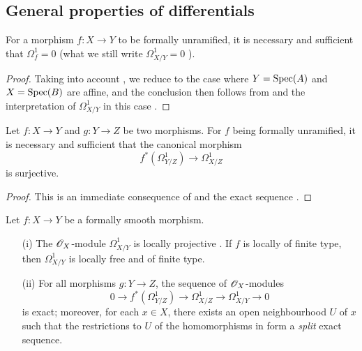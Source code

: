 \subsection{General properties of differentials}
\label{subsection:IV.17.2}

\begin{proposition}[17.2.1]
\label{IV.17.2.1}
For a morphism $f:X\to Y$ to be formally unramified, it is necessary and sufficient that $\Omega_f^1=0$ (what we still write $\Omega_{X/Y}^1=0$ ).  
\end{proposition}

\begin{proof}
Taking into account , we reduce to the case where $Y=\operatorname{Spec}(A)$ and $X=\operatorname{Spec}(B)$ are affine, and the conclusion then follows from  and the interpretation of $\Omega_{X/Y}^1$ in this case .
\end{proof}

\begin{corollary}[17.2.2]
\label{IV.17.2.2}
Let $f:X\to Y$ and $g:Y\to Z$ be two morphisms. 
For $f$ being formally unramified, it is necessary and sufficient that the canonical morphism 
\[
  f^*(\Omega^1_{Y/Z})\to \Omega^1_{X/Z}
\] is surjective.
\end{corollary}

\begin{proof}
This is an immediate consequence of  and the exact sequence .
\end{proof}

\begin{proposition}[17.2.3]
\label{IV.17.2.3}
Let $f:X\to Y$ be a formally smooth morphism.
\begin{enumerate}
  \item[{\rm(i)}] The $\mathscr{O}_X$-module $\Omega_{X/Y}^1$ is locally projective .
    If $f$ is locally of finite type, then $\Omega_{X/Y}^1$ is locally free and of finite type.
  \item[{\rm(ii)}] For all morphisms $g:Y\to Z$, the sequence  of $\mathscr{O}_X$-modules
\[
\label{IV.17.2.3.1}
  0\to f^*(\Omega_{Y/Z}^1)\to\Omega_{X/Z}^1\to\Omega_{X/Y}^1\to 0
  \tag{17.2.3.1}
\]
is exact; moreover, for each $x\in X$, there exists an open neighbourhood $U$ of $x$ such that the restrictions to $U$ of the homomorphisms in  form a \emph{split} exact sequence.
\end{enumerate}
\end{proposition}

